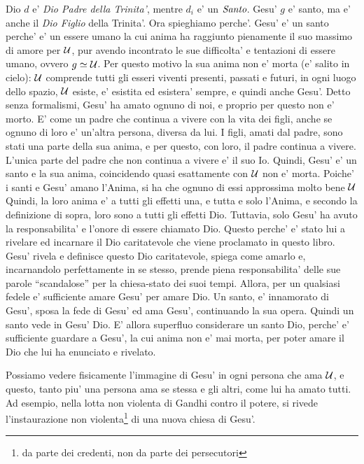 Dio $d$ e' \emph{Dio Padre della Trinita'}, mentre $d_i$ e' un $\emph{Santo}$. Gesu' $g$ e' santo, ma e' anche il \emph{Dio Figlio} della Trinita'. Ora spieghiamo perche'. Gesu' e' un santo perche' e' un essere umano la cui anima ha raggiunto pienamente il suo massimo di amore per $\mathcal{U}$, pur avendo incontrato le sue difficolta' e tentazioni di essere umano, ovvero $g \simeq \mathcal{U}$. Per questo motivo la sua anima non e' morta (e' salito in cielo): $\mathcal{U}$ comprende tutti gli esseri viventi presenti, passati e futuri, in ogni luogo dello spazio, $\mathcal{U}$ esiste, e' esistita ed esistera' sempre, e quindi anche Gesu'. Detto senza formalismi, Gesu' ha amato ognuno di noi, e proprio per questo non e' morto. E' come un padre che continua a vivere con la vita dei figli, anche se ognuno di loro e' un'altra persona, diversa da lui. I figli, amati dal padre, sono stati una parte della sua anima, e per questo, con loro, il padre continua a vivere. L'unica parte del padre che non continua a vivere e' il suo Io. Quindi, Gesu' e' un santo e la sua anima, coincidendo quasi esattamente con $\mathcal{U}$ non e' morta. Poiche' i santi e Gesu' amano l'Anima, si ha che ognuno di essi approssima molto bene $\mathcal{U} $ Quindi, la loro anima e' a tutti gli effetti una, e tutta e solo l'Anima, e secondo la definizione di sopra, loro sono a tutti gli effetti Dio. Tuttavia, solo Gesu' ha avuto la responsabilita' e l'onore di essere chiamato Dio. Questo perche' e' stato lui a rivelare ed incarnare il Dio caritatevole che viene proclamato in questo libro. Gesu' rivela e definisce questo Dio caritatevole, spiega come amarlo e, incarnandolo perfettamente in se stesso, prende piena responsabilita' delle sue parole ``scandalose'' per la chiesa-stato dei suoi tempi. Allora, per un qualsiasi fedele e' sufficiente amare Gesu' per amare Dio. Un santo, e' innamorato di Gesu', sposa la fede di Gesu' ed ama Gesu', continuando la sua opera. Quindi un santo vede in Gesu' Dio. E' allora superfluo considerare un santo Dio, perche' e' sufficiente guardare a Gesu', la cui anima non e' mai morta, per poter amare il Dio che lui ha enunciato e rivelato.

Possiamo vedere fisicamente l'immagine di Gesu' in ogni persona che ama $\mathcal{U}$, e questo, tanto piu' una persona ama se stessa e gli altri, come lui ha amato tutti. Ad esempio, nella lotta non violenta di Gandhi contro il potere, si rivede l'instaurazione non violenta\footnote{da parte dei credenti, non da parte dei persecutori} di una nuova chiesa di Gesu'.

